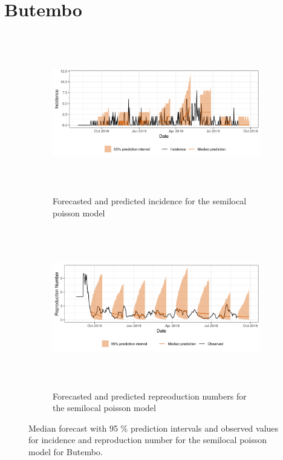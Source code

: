  \section{ Butembo }\begin{figure}[H]\begin{subfigure}{\textwidth}  \centering  \includegraphics[width=0.9\linewidth, height=7cm]{../output/Butembo_predictions.png}  \caption{Forecasted and predicted incidence for the semilocal poisson model}\end{subfigure}

\begin{subfigure}{\textwidth}  \centering  \includegraphics[width=0.9\linewidth, height=7cm]{../output/Butembo_Rs.png}  \caption{Forecasted and predicted repreoduction numbers for the semilocal poisson model}\end{subfigure}  \caption{Median forecast with 95 \% prediction intervals and observed values for incidence and reproduction number for the semilocal poisson model for Butembo.}\end{figure}

